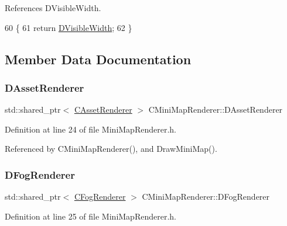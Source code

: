 References D\+Visible\+Width.


\begin{DoxyCode}
60                                          \{
61     \textcolor{keywordflow}{return} \hyperlink{classCMiniMapRenderer_aedcb790a697e6f606cd7fa5089a41359}{DVisibleWidth};
62 \}
\end{DoxyCode}


\subsection{Member Data Documentation}
\hypertarget{classCMiniMapRenderer_a352998f61c6777ccb3969712b8e691d9}{}\label{classCMiniMapRenderer_a352998f61c6777ccb3969712b8e691d9} 
\subsubsection{\texorpdfstring{D\+Asset\+Renderer}{DAssetRenderer}}
{\footnotesize\ttfamily std\+::shared\+\_\+ptr$<$ \hyperlink{classCAssetRenderer}{C\+Asset\+Renderer} $>$ C\+Mini\+Map\+Renderer\+::\+D\+Asset\+Renderer\hspace{0.3cm}{\ttfamily [protected]}}



Definition at line 24 of file Mini\+Map\+Renderer.\+h.



Referenced by C\+Mini\+Map\+Renderer(), and Draw\+Mini\+Map().

\hypertarget{classCMiniMapRenderer_a51a715ce4773d3fa3f433a282632035c}{}\label{classCMiniMapRenderer_a51a715ce4773d3fa3f433a282632035c} 
\subsubsection{\texorpdfstring{D\+Fog\+Renderer}{DFogRenderer}}
{\footnotesize\ttfamily std\+::shared\+\_\+ptr$<$ \hyperlink{classCFogRenderer}{C\+Fog\+Renderer} $>$ C\+Mini\+Map\+Renderer\+::\+D\+Fog\+Renderer\hspace{0.3cm}{\ttfamily [protected]}}



Definition at line 25 of file Mini\+Map\+Renderer.\+h.



